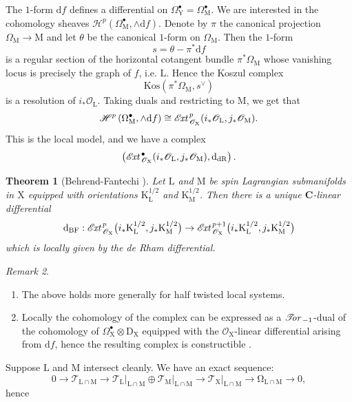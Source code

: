 \documentclass{article}
\theoremstyle{plain}
\newtheorem{theorem}{Theorem}[subsection]   %
\theoremstyle{definition}
\theoremstyle{remark}
\newtheorem{remark}[theorem]{Remark}
\newcommand{\mr}{\mathrm}
\newcommand{\C}{\mathbf C}
\newcommand{\3}{\vspace{3mm}}
\newcommand{\2}{\vspace{2mm}}
\newcommand{\1}{\vspace{1mm}}
\newcommand*{\ext}{\mathscr{E}\text{\kern -1.5pt {\it{xt}}}\,}
\newcommand*{\tor}{\mathscr{T}\text{\kern -3pt {\it{or}}}\,}
\begin{document}
The $1$-form $\mr{d}f$ defines a differential on $\Omega^\bullet_\mr{Y}=\Omega^\bullet_\mr{M}$. We are interested in the cohomology sheaves $\mathscr{H}^p\left(\Omega^\bullet_\mr{M},\wedge \mr{d}f\right)$. Denote by $\pi$ the canonical projection $\Omega_\mr{M} \to \mr{M}$ and let $\theta$ be the canonical $1$-form on $\Omega_\mr{M}$. Then the $1$-form $$s=\theta - \pi^*\mr{d}f$$ is a regular section of the horizontal cotangent bundle $\pi^*\Omega_{\mr{M}}$ whose vanishing locus is precisely the graph of $f$, i.e. $\mr{L}$. Hence the Koszul complex $$\mr{Kos}\left(\pi^*\Omega_{\mr{M}},s^\vee\right)$$ is a resolution of $i_*\mathscr{O}_\mr{L}$. Taking duals and restricting to $\mr{M}$, we get that $$\mathscr{H}^p\left(\Omega^\bullet_\mr{M},\wedge \mr{d}f\right) \cong \ext^{p}_{\mathscr{O}_\mr{X}}(i_{*}\mathscr{O}_{\mr{L}},j_{*}\mathscr{O}_{\mr{M}}).$$ This is the local model, and we have a complex $$\left(\ext^{\bullet}_{\mathscr{O}_\mr{X}}(i_{*}\mathscr{O}_{\mr{L}},j_{*}\mathscr{O}_{\mr{M}}),\mr{d}_\mr{dR}\right).$$ 
\begin{theorem}[Behrend-Fantechi \cite{MR2641169}]
Let $\mr{L}$ and $\mr{M}$ be spin Lagrangian submanifolds in $\mr{X}$ equipped with orientations $\mr{K}_\mr{L}^{1/2}$ and $\mr{K}_\mr{M}^{1/2}$. Then there is a unique $\C$-linear differential $$\mr{d}_\mr{BF} :\ext^{p}_{\mathscr{O}_\mr{X}}\big(i_{*}\mr{K_{L}^{1/2}},j_{*}\mr{K_{M}^{1/2}}\big)\to \ext^{p+1}_{\mathscr{O}_\mr{X}}\big(i_{*}\mr{K_{L}^{1/2}},j_{*}\mr{K_{M}^{1/2}}\big)$$ which is locally given by the de Rham differential. 
\end{theorem}
\2
\begin{remark}
\begin{enumerate}
\item The above holds more generally for half twisted local systems.
\item Locally the cohomology of the complex can be expressed as a $\tor_{-1}$-dual of the cohomology of $\Omega^\bullet_\mr{X}\otimes \mr{D}_\mr{X}$ equipped with the $\mathscr{O}_\mr{X}$-linear differential arising from $\mr{d}f$, hence the resulting complex is constructible \cite{MR1181207}.
\end{enumerate}
\end{remark}
Suppose $\mr{L}$ and $\mr{M}$ intersect cleanly. We have an exact sequence: $$\mr{0 \to \mathscr{T}_{\mr{L}\cap\mr{M}} \to \left.\mathscr{T}_{L}\right|_{\mr{L}\cap\mr{M}} \oplus \left.\mathscr{T}_{M}\right|_{\mr{L}\cap\mr{M}} \to \left.\mathscr{T}_{X}\right|_{\mr{L}\cap\mr{M}} \to \Omega_{\mr{L}\cap\mr{M}}} \to 0,$$ hence
\end{document}

